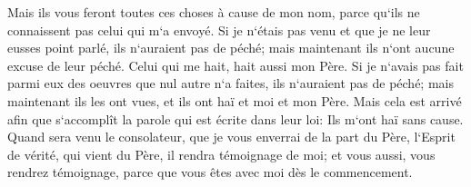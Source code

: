 \verse Mais ils vous feront toutes ces choses à cause de mon nom, parce qu`ils ne connaissent pas celui qui m`a envoyé. 
\verse Si je n`étais pas venu et que je ne leur eusses point parlé, ils n`auraient pas de péché; mais maintenant ils n`ont aucune excuse de leur péché. 
\verse Celui qui me hait, hait aussi mon Père. 
\verse Si je n`avais pas fait parmi eux des oeuvres que nul autre n`a faites, ils n`auraient pas de péché; mais maintenant ils les ont vues, et ils ont haï et moi et mon Père. 
\verse Mais cela est arrivé afin que s`accomplît la parole qui est écrite dans leur loi: Ils m`ont haï sans cause. 
\verse Quand sera venu le consolateur, que je vous enverrai de la part du Père, l`Esprit de vérité, qui vient du Père, il rendra témoignage de moi; 
\verse et vous aussi, vous rendrez témoignage, parce que vous êtes avec moi dès le commencement. 

\chapter{}

